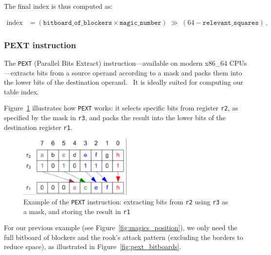 \vspace{1em}

\noindent The final index is thus computed as:

\begin{align*}
    \text{index}
    &= (\texttt{bitboard\_of\_blockers} \times \texttt{magic\_number})
       \;\gg\;(64 - \texttt{relevant\_squares})\,.
\end{align*}

\subsubsection{PEXT instruction}

\noindent The \texttt{PEXT} (Parallel Bits Extract) instruction—available on modern x86\_64 CPUs—extracts bits from a source operand according to a mask and packs them into the lower bits of the destination operand.~\cite{PextInstruction} It is ideally suited for computing our table index.

Figure~\ref{fig:pext_instruction_example} illustrates how \texttt{PEXT} works: it selects specific bits from register \texttt{r2}, as specified by the mask in \texttt{r3}, and packs the result into the lower bits of the destination register \texttt{r1}.

\begin{figure}[H]
    \centering
    \includegraphics[width=0.5\textwidth]{Imagenes/pext.png}
    \caption{Example of the \texttt{PEXT} instruction: extracting bits from \texttt{r2} using \texttt{r3} as a mask, and storing the result in \texttt{r1}}
    \label{fig:pext_instruction_example}
\end{figure}

\noindent For our previous example (see Figure~\ref{fig:magics_position}), we only need the full bitboard of blockers and the rook’s attack pattern (excluding the borders to reduce space), as illustrated in Figure~\ref{fig:pext_bitboards}.

